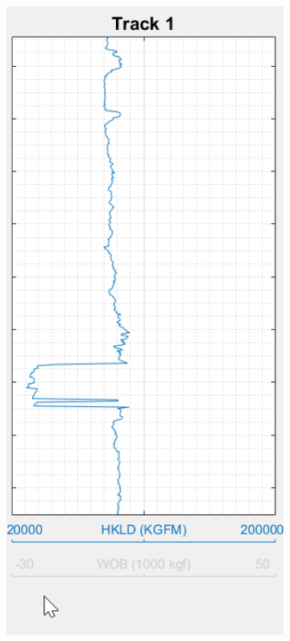 \documentclass[12pt,a4paper,oneside]{report}
\begin{document}
\begin{figure}[H]
\begin{subfigure}[b]{0.31\textwidth}
    \caption{}
    \label{fig:f1}
  \end{subfigure}
  \hfill
  \begin{subfigure}[b]{0.31\textwidth}
    \includegraphics[width=\textwidth]{2_hide.png}

\end{subfigure}
\end{figure}
\end{document}

